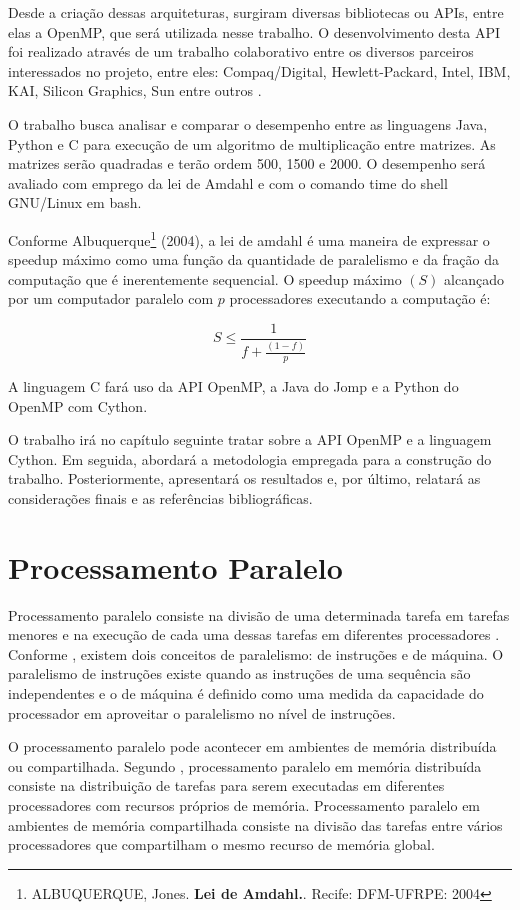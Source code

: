 \documentclass[a4paper,12pt]{article}
\begin{document}
	Desde a criação dessas arquiteturas, surgiram diversas bibliotecas ou APIs, entre elas a OpenMP, que será utilizada nesse trabalho. O desenvolvimento  desta API foi realizado através de um trabalho colaborativo entre os diversos parceiros interessados no projeto, entre eles: Compaq/Digital, Hewlett-Packard, Intel, IBM, KAI, Silicon Graphics, Sun entre outros \cite{sato}. 
	
	O trabalho busca analisar e comparar o desempenho entre as linguagens Java, Python e C para execução de um algoritmo de multiplicação entre matrizes. As matrizes serão quadradas e terão ordem 500, 1500 e 2000. O desempenho será avaliado com emprego da lei de Amdahl e com o comando time do shell GNU/Linux em bash. 
	
	Conforme Albuquerque\footnote{ALBUQUERQUE, Jones. {\bf Lei de Amdahl.}. Recife: DFM-UFRPE: 2004} (2004), a lei de amdahl é uma maneira de expressar o speedup máximo como uma função da quantidade de paralelismo e da fração da computação que é inerentemente sequencial. O speedup máximo $(S)$ alcançado por um computador paralelo com $p$ processadores executando a computação é:
	
\begin{equation}
  \label{eq:amdahl}
   S \le \frac{1}{f + \frac{(1-f)}{p}}
\end{equation}

A linguagem C fará uso da API OpenMP, a Java do Jomp e a Python do  OpenMP com Cython.

O trabalho irá no capítulo seguinte tratar sobre a API OpenMP e a linguagem Cython. Em seguida, abordará a metodologia empregada para a construção do trabalho. Posteriormente, apresentará os resultados e, por último, relatará as considerações finais e as referências bibliográficas. 

\section{Processamento Paralelo}
Processamento paralelo consiste na divisão de uma determinada tarefa em tarefas menores e na execução de cada uma dessas tarefas em diferentes processadores \cite{tutopenmp}. Conforme \cite{william}, existem dois conceitos de paralelismo: de instruções e de máquina. O paralelismo de instruções existe quando as instruções de uma sequência são independentes e o de máquina é definido como uma medida da capacidade do processador em aproveitar o paralelismo no nível de instruções.

O processamento paralelo pode acontecer em ambientes de memória distribuída ou compartilhada. Segundo \cite{tutopenmp}, processamento paralelo em memória distribuída consiste na distribuição de tarefas para serem executadas em diferentes processadores com recursos próprios de memória. Processamento paralelo em ambientes de memória compartilhada consiste na divisão das tarefas entre vários processadores que compartilham o mesmo recurso de memória global.
\end{document}
